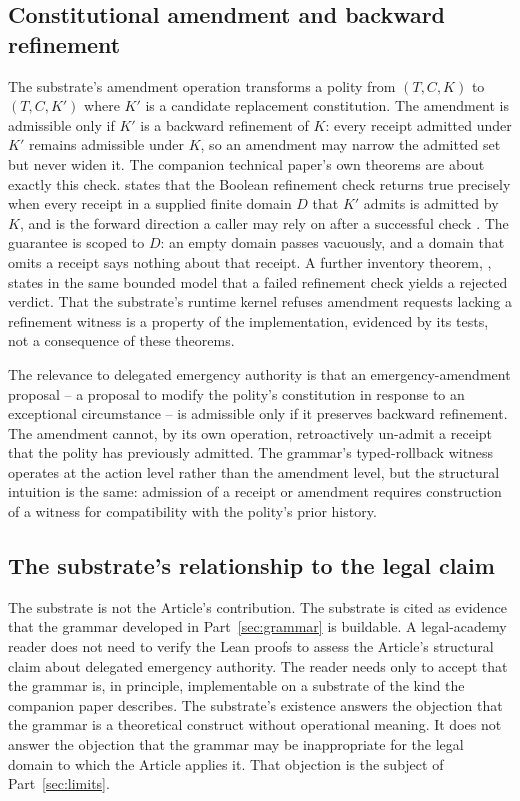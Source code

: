 \subsection{Constitutional amendment and backward refinement}

The substrate's amendment operation transforms a polity from $(T, C, K)$ to $(T, C, K')$ where $K'$ is a
candidate replacement constitution.
The amendment is admissible only if $K'$ is a backward refinement of $K$:
every receipt admitted under $K'$ remains admissible under $K$, so an amendment may narrow the
admitted set but never widen it.
The companion technical paper's own theorems are about exactly this check.
 states that the Boolean refinement check returns true precisely when every receipt
in a supplied finite domain $D$ that $K'$ admits is admitted by $K$, and  is the
forward direction a caller may rely on after a successful check \cite{ref_chio_parent_paper}.
The guarantee is scoped to $D$: an empty domain passes vacuously, and a domain that omits a receipt says nothing
about that receipt.
A further inventory theorem, , states in the same bounded model that a
failed refinement check yields a rejected verdict.
That the substrate's runtime kernel refuses amendment requests lacking a refinement witness is a property of the
implementation, evidenced by its tests, not a consequence of these theorems.

The relevance to delegated emergency authority is that an emergency-amendment proposal --
a proposal to modify the polity's constitution in response to an exceptional circumstance --
is admissible only if it preserves backward refinement.
The amendment cannot, by its own operation, retroactively un-admit a receipt that the polity has previously admitted.
The grammar's typed-rollback witness operates at the action level rather than the amendment level,
but the structural intuition is the same:
admission of a receipt or amendment requires construction of a witness for compatibility with the polity's
prior history.

\subsection{The substrate's relationship to the legal claim}

The substrate is not the Article's contribution.
The substrate is cited as evidence that the grammar developed in Part~\ref{sec:grammar} is buildable.
A legal-academy reader does not need to verify the Lean proofs to assess the Article's structural claim about
delegated emergency authority.
The reader needs only to accept that the grammar is, in principle, implementable on a substrate of the kind
the companion paper describes.
The substrate's existence answers the objection that the grammar is a theoretical construct without operational meaning.
It does not answer the objection that the grammar may be inappropriate for the legal domain to which the Article applies it.
That objection is the subject of Part~\ref{sec:limits}.
